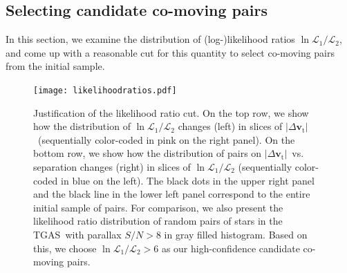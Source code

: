 \documentclass[manuscript, letterpaper]{aastex6}
\newcommand{\acronym}[1]{{\small{#1}}}
\newcommand{\tgas}{\acronym{TGAS}}
\newcommand{\bs}[1]{\boldsymbol{#1}}
\renewcommand{\vec}[1]{\bs{#1}}
\newcommand{\absdvtan}{\ensuremath{|\Delta\vec v_\mathrm{t}|}}
\begin{document}
\subsection{Selecting candidate co-moving pairs}
\label{sub:selection}

In this section, we examine the distribution of (log-)likelihood ratios
$\ln \mathcal{L}_1 /\mathcal{L}_2$, and come up with a reasonable cut
for this quantity to select co-moving pairs from the initial sample.

\begin{figure}[htbp]
  \begin{center}
    \texttt{[image: likelihoodratios.pdf]}
  \end{center}
  \caption{%
    Justification of the likelihood ratio cut.
    On the top row, we show how the distribution of $\ln \mathcal{L}_1 /\mathcal{L}_2$
    changes (left) in slices of \absdvtan\ (sequentially color-coded in pink on the right panel).
    On the bottom row, we show how the distribution of pairs on \absdvtan\ vs. separation changes (right)
    in slices of $\ln \mathcal{L}_1 /\mathcal{L}_2$ (sequentially color-coded in blue on the left).
    The black dots in the upper right panel and
    the black line in the lower left panel correspond to the entire initial sample of pairs.
    For comparison, we also present the likelihood ratio distribution of random pairs
    of stars in the \tgas\ with parallax $S/N>8$ in gray filled histogram.
    Based on this, we choose $\ln \mathcal{L}_1 /\mathcal{L}_2 > 6$ as our high-confidence
    candidate co-moving pairs.
    \label{fig:likelihoodratios}}
    \vspace{1em}
\end{figure}
\end{document}
